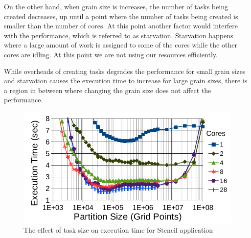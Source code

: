 On the other hand, when grain size is increases, the number of tasks being created decreases, up until a point where the number of tasks being created is smaller than the number of cores. At this point another factor would interfere with the performance, which is referred to as starvation. Starvation happens where a large amount of work is assigned to some of the cores while the other cores are idling. At this point we are not using our resources efficiently. 

While overheads of creating tasks degrades the performance for small grain sizes and starvation causes the execution time to increase for large grain sizes, there is a region in between where changing the grain size does not affect the performance. 

\vspace{\baselineskip}
\begin{figure}[H]
	\centering
	\includegraphics[scale=0.6]{images/task_granularity.png}
	\caption{The effect of task size on execution time for Stencil application \cite{grubel2015performance}}	
	\label{fig_task_gran}
\end{figure}





